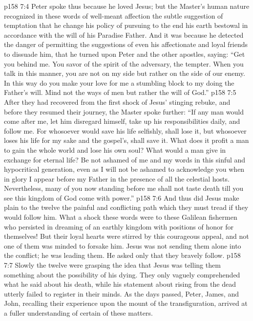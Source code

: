 \vs p158 7:4 Peter spoke thus because he loved Jesus; but the Master’s human nature recognized in these words of well\hyp{}meant affection the subtle suggestion of temptation that he change his policy of pursuing to the end his earth bestowal in accordance with the will of his Paradise Father. And it was because he detected the danger of permitting the suggestions of even his affectionate and loyal friends to dissuade him, that he turned upon Peter and the other apostles, saying: \textcolor{ubdarkred}{“Get you behind me. You savor of the spirit of the adversary, the tempter. When you talk in this manner, you are not on my side but rather on the side of our enemy. In this way do you make your love for me a stumbling block to my doing the Father’s will. Mind not the ways of men but rather the will of God.”}
\vs p158 7:5 After they had recovered from the first shock of Jesus’ stinging rebuke, and before they resumed their journey, the Master spoke further: \textcolor{ubdarkred}{“If any man would come after me, let him disregard himself, take up his responsibilities daily, and follow me. For whosoever would save his life selfishly, shall lose it, but whosoever loses his life for my sake and the gospel’s, shall save it. What does it profit a man to gain the whole world and lose his own soul? What would a man give in exchange for eternal life? Be not ashamed of me and my words in this sinful and hypocritical generation, even as I will not be ashamed to acknowledge you when in glory I appear before my Father in the presence of all the celestial hosts. Nevertheless, many of you now standing before me shall not taste death till you see this kingdom of God come with power.”}
\vs p158 7:6 And thus did Jesus make plain to the twelve the painful and conflicting path which they must tread if they would follow him. What a shock these words were to these Galilean fishermen who persisted in dreaming of an earthly kingdom with positions of honor for themselves! But their loyal hearts were stirred by this courageous appeal, and not one of them was minded to forsake him. Jesus was not sending them alone into the conflict; he was leading them. He asked only that they bravely follow.
\vs p158 7:7 Slowly the twelve were grasping the idea that Jesus was telling them something about the possibility of his dying. They only vaguely comprehended what he said about his death, while his statement about rising from the dead utterly failed to register in their minds. As the days passed, Peter, James, and John, recalling their experience upon the mount of the transfiguration, arrived at a fuller understanding of certain of these matters.
